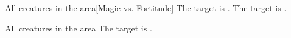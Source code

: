 \begin{spellheader}
    \spelldur{\durshort}
\end{spellheader}
\begin{spelleffects}
    \begin{spelltargets}{All creatures in the area}[Magic vs. Fortitude]
        \spellsuccess The target is \exhausted.
        \spellfailure The target is \fatigued.
    \end{spelltargets}
\end{spelleffects}
\begin{spellfooter}
    
\end{spellfooter}

\begin{spellheader}
    \spelldur{\durshort}
\end{spellheader}
\begin{spelleffects}
    \begin{spelltargets}{All creatures in the area}
        \spelleffect The target is \fatigued.
    \end{spelltargets}
\end{spelleffects}
\begin{spellfooter}
    
\end{spellfooter}

